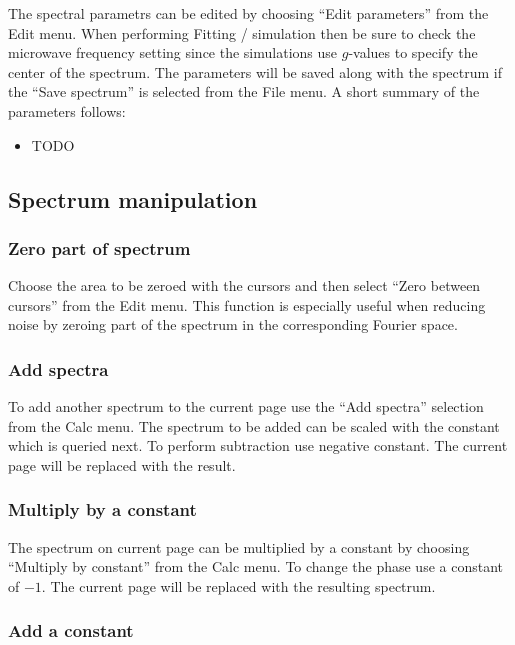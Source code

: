 \documentclass[byrevtex,amssymb,aps,pra,floatfix,letterpaper]{revtex4}
\begin{document}
The spectral parametrs can be edited by choosing ``Edit parameters'' from the Edit menu. When performing Fitting / simulation then be sure to check the microwave frequency setting since the simulations use $g$-values to specify the center of the spectrum. The parameters will be saved along with the spectrum if the ``Save spectrum'' is selected from the File menu. A short summary of the parameters follows:

\begin{itemize}
 \item TODO
\end{itemize}

\subsection{Spectrum manipulation}

\subsubsection{Zero part of spectrum}

Choose the area to be zeroed with the cursors and then select ``Zero between cursors'' from the Edit menu. This function is especially useful when reducing noise by zeroing part of the spectrum in the corresponding Fourier space.

\subsubsection{Add spectra}

To add another spectrum to the current page use the ``Add spectra'' selection from the Calc menu. The spectrum to be added can be scaled with the constant which is queried next. To perform subtraction use negative constant. The current page will be replaced with the result.

\subsubsection{Multiply by a constant}

The spectrum on current page can be multiplied by a constant by choosing ``Multiply by constant'' from the Calc menu. To change the phase use a constant of $-1$. The current page will be replaced with the resulting spectrum.

\subsubsection{Add a constant}
\end{document}
